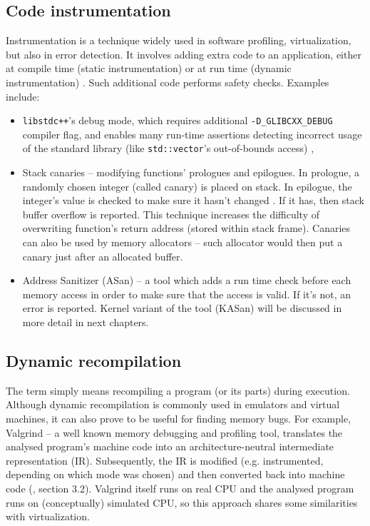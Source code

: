 \documentclass[shortabstract, manyadvisors, english, mgr]{iithesis}
\theoremstyle{definition} \newtheorem*{definition}{Definicja}
\theoremstyle{definition} \newtheorem*{example}{Przykład}
\theoremstyle{definition} \newtheorem*{remark}{Uwaga}
\begin{document}
\subsection{Code instrumentation}
Instrumentation is a technique widely used in software profiling, virtualization, but also in error detection. It involves adding extra code to an application, either at compile time (static instrumentation) or at run time (dynamic instrumentation) \cite{bib:software-instrumentation}. Such additional code performs safety checks. Examples include:
\begin{itemize}
    \item \texttt{libstdc++}'s debug mode, which requires additional \texttt{-D\_GLIBCXX\_DEBUG} compiler flag, and enables many run-time assertions detecting incorrect usage of the standard library (like \texttt{std::vector}'s out-of-bounds access) \cite{bib:libstdc++-debug},
    \item Stack canaries -- modifying functions' prologues and epilogues. In prologue, a randomly chosen integer (called canary) is placed on stack. In epilogue, the integer's value is checked to make sure it hasn't changed \cite{bib:stack-canaries}. If it has, then stack buffer overflow is reported. This technique increases the difficulty of overwriting function's return address (stored within stack frame). Canaries can also be used by memory allocators -- such allocator would then put a canary just after an allocated buffer.
    \item Address Sanitizer (ASan) -- a tool which adds a run time check before each memory access in order to make sure that the access is valid. If it's not, an error is reported. Kernel variant of the tool (KASan) will be discussed in more detail in next chapters.
\end{itemize}
\subsection{Dynamic recompilation}
The term simply means recompiling a program (or its parts) during execution. Although dynamic recompilation is commonly used in emulators and virtual machines, it can also prove to be useful for finding memory bugs. For example, Valgrind -- a well known memory debugging and profiling tool, translates the analysed program's machine code into an architecture-neutral intermediate representation (IR). Subsequently, the IR is modified (e.g. instrumented, depending on which mode was chosen) and then converted back into machine code (\cite{bib:valgrind}, section 3.2). Valgrind itself runs on real CPU and the analysed program runs on (conceptually) simulated CPU, so this approach shares some similarities with virtualization.
\end{document}
